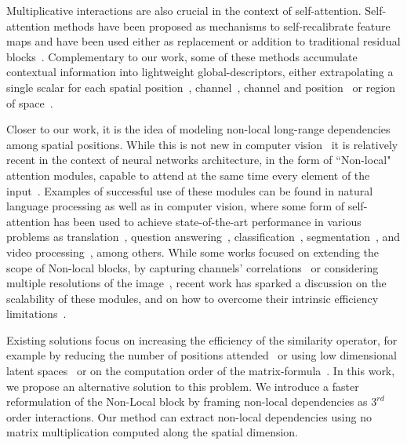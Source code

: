 \documentclass[10pt,twocolumn,letterpaper]{article}
\begin{document}
 Multiplicative interactions are also crucial in the context of self-attention. Self-attention methods have been proposed as mechanisms to self-recalibrate feature maps and have been used either as replacement or addition to traditional residual blocks~\cite{he2016deep}.
 Complementary to our work, some of these methods accumulate contextual information into lightweight global-descriptors, either extrapolating a single scalar for each spatial position~\cite{wang2017residual}, channel~\cite{hu2018squeeze, cao2019gcnet}, channel and position~\cite{woo2018cbam} or region of space~\cite{li2019spatial}.
 
 Closer to our work, it is the idea of modeling non-local long-range dependencies among spatial positions. While this is not new in computer vision~\cite{buades2005non, lafferty2001conditional, dabov2007image} it is relatively recent in the context of neural networks architecture, in the form of ``Non-local" attention modules, capable to attend at the same time every element of the input~\cite{wang2018non, vaswani2017attention}. Examples of successful use of these modules can be found in natural language processing as well as in computer vision, where some form of self-attention has been used to achieve state-of-the-art performance in various problems as translation~\cite{ott2018scaling},  question answering~\cite{mohamed2019transformers}, classification~\cite{ramachandran2019stand, Bello_2019_ICCV}, segmentation~\cite{wang2020axial, carion2020end}, and video processing~\cite{wang2019edvr}, among others. While some works focused on extending the scope of Non-local blocks, by capturing channels' correlations~\cite{babiloni2020tesa, yue2018compact, fu2019dual} or considering multiple resolutions of the image~\cite{mei2020pyramid, dai2019second}, recent work has sparked a discussion on the scalability of these modules, and on how to overcome their  intrinsic efficiency limitations~\cite{tay2020efficient}.
 
 
Existing solutions focus on increasing the efficiency of the similarity operator, for example by reducing the number of positions attended~\cite{child2019generating, zhang2020dynamic} or using low dimensional latent spaces~\cite{choromanski2020rethinking, zhang2019latentgnn, chen2019graph, wang2020linformer} or on the computation order of the matrix-formula~\cite{shen2021efficient, katharopoulos2020transformers}. In this work, we propose an alternative solution to this problem.  We introduce a faster reformulation of the Non-Local block by framing non-local dependencies as $3^{rd}$ order interactions. Our method can extract non-local dependencies using no matrix multiplication computed along the spatial dimension.
\end{document}
